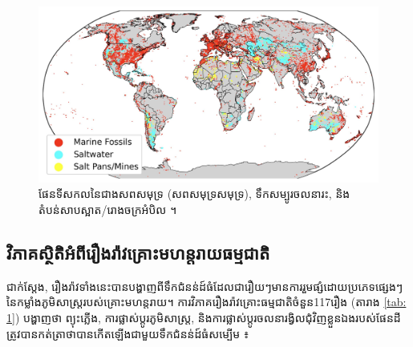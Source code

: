 \documentclass[10pt,twocolumn,letterpaper]{article}
\begin{document}
\begin{figure}[b]
\begin{center}

\includegraphics[width=1\textwidth]{marine.jpg}
\end{center}
   \caption{ផែនទីសកលនៃជាងសពសមុទ្រ (សពសមុទ្រសមុទ្រ), ទឹកសម្បូរចលនារះ, និងតំបន់សាបស្អាត/រោងចក្រអំបិល \cite{15,16,86,87}។}
   \label{fig:2}
\end{figure}

\subsection{វិភាគស្ថិតិអំពីរឿងរ៉ាវគ្រោះមហន្តរាយធម្មជាតិ}

ជាក់ស្តែង, រឿងរ៉ាវទាំងនេះបានបង្ហាញពីទឹកជំនន់ដ៍ធំដែលជារឿយៗមានការរួមផ្សំដោយប្រភេទផ្សេងៗនៃកម្លាំងភូមិសាស្ត្ររបស់គ្រោះមហន្តរាយ។ ការវិភាគរឿងរ៉ាវគ្រោះធម្មជាតិចំនួន​117រឿង​ (តារាង \ref{tab: 1}) បង្ហាញថា ព្យុះភ្លើង, ការផ្លាស់ប្ដូរភូមិសាស្ត្រ, និងការផ្លាស់ប្ដូរចលនារង្វិលជុំវិញខ្លួនឯងរបស់ផែនដីត្រូវបានកត់ត្រាថាបានកើតឡើងជាមួយទឹកជំនន់ដ៍ធំសម្បើម \cite{14}៖
\end{document}
